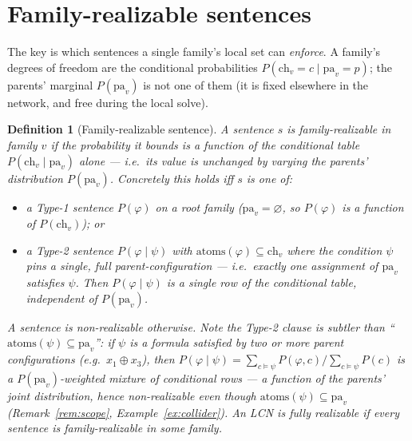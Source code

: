 \documentclass[11pt]{article}
\newtheorem{definition}{Definition}
\newcommand{\ch}{\mathrm{ch}}
\newcommand{\pa}{\mathrm{pa}}
\newcommand{\atoms}{\mathrm{atoms}}
\begin{document}
\section{Family-realizable sentences}\label{sec:realizable}

The key is which sentences a single family's local set can \emph{enforce}. A family's degrees of
freedom are the conditional probabilities $P(\ch_v{=}c\mid\pa_v{=}p)$; the parents' marginal
$P(\pa_v)$ is not one of them (it is fixed elsewhere in the network, and free during the local solve).

\begin{definition}[Family-realizable sentence]\label{def:realizable}
A sentence $s$ is \emph{family-realizable} in family $v$ if the probability it bounds is a function of
the conditional table $P(\ch_v\mid\pa_v)$ \emph{alone} --- i.e.\ its value is unchanged by varying the
parents' distribution $P(\pa_v)$. Concretely this holds iff $s$ is one of:
\begin{itemize}
  \item a Type-1 sentence $P(\varphi)$ on a \emph{root} family ($\pa_v=\varnothing$, so $P(\varphi)$
    \emph{is} a function of $P(\ch_v)$); or
  \item a Type-2 sentence $P(\varphi\mid\psi)$ with $\atoms(\varphi)\subseteq\ch_v$ where the
    condition $\psi$ pins a \emph{single, full} parent-configuration --- i.e.\ exactly one assignment
    of $\pa_v$ satisfies $\psi$. Then $P(\varphi\mid\psi)$ is a single row of the conditional table,
    independent of $P(\pa_v)$.
\end{itemize}
A sentence is \emph{non-realizable} otherwise. Note the Type-2 clause is subtler than
``$\atoms(\psi)\subseteq\pa_v$'': if $\psi$ is a \emph{formula} satisfied by two or more parent
configurations (e.g.\ $x_1\oplus x_3$), then
$P(\varphi\mid\psi)=\sum_{c\models\psi}P(\varphi,c)\big/\sum_{c\models\psi}P(c)$ is a
$P(\pa_v)$-weighted mixture of conditional rows --- a function of the parents' \emph{joint}
distribution, hence non-realizable even though $\atoms(\psi)\subseteq\pa_v$
(Remark~\ref{rem:scope}, Example~\ref{ex:collider}). An LCN is \emph{fully realizable} if every
sentence is family-realizable in some family.
\end{definition}
\end{document}
